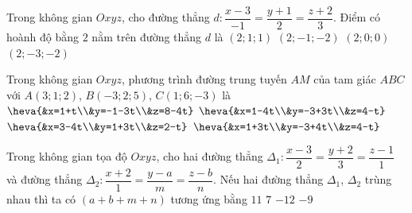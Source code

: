\begin{ex}%
Trong không gian $Oxyz$, cho đường thẳng $d\colon \dfrac{x-3}{-1}=\dfrac{y+1}{2}=\dfrac{z+2}{3}$. Điểm có hoành độ bằng $2$ nằm trên đường thẳng $d$ là
\choice
{\True $\left(2;1;1\right)$}
{$\left(2;-1;-2\right)$}
{$\left(2;0;0\right)$}
{$\left(2;-3;-2\right)$}

\end{ex}

\begin{ex}%
Trong không gian $Oxyz$, phương trình đường trung tuyến $AM$ của tam giác $ABC$ với $A(3;1;2)$, $B(-3;2;5)$, $C(1;6;-3)$ là
\choice
{$\heva{&x=1+t\\&y=-1-3t\\&z=8-4t}$}
{$\heva{&x=1-4t\\&y=-3+3t\\&z=4-t}$}
{\True $\heva{&x=3-4t\\&y=1+3t\\&z=2-t}$}
{$\heva{&x=1+3t\\&y=-3+4t\\&z=4-t}$}
\end{ex}

\begin{ex}%
Trong không gian tọa độ $Oxyz$, cho hai đường thẳng $\Delta_1\colon \dfrac{x-3}{2}=\dfrac{y+2}{3}=\dfrac{z-1}{1}$ và đường thẳng $\Delta_2\colon \dfrac{x+2}{1}=\dfrac{y-a}{m}=\dfrac{z-b}{n}$. Nếu hai đường thẳng $\Delta_1$, $\Delta_2$ trùng nhau thì ta có $(a+b+m+n)$ tương ứng bằng
\choice
{$11$}
{$7$}
{$-12$}
{\True $-9$}
\end{ex}

